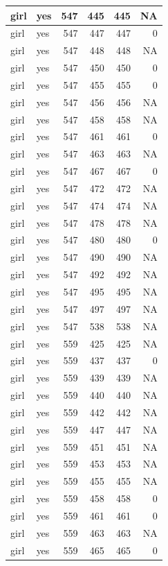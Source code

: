 \documentclass[man]{apa6}
\begin{document}
\begin{tabular}{l|l|r|r|r|r}
\hline
girl & yes & 547 & 445 & 445 & NA\\
\hline
girl & yes & 547 & 447 & 447 & 0\\
\hline
girl & yes & 547 & 448 & 448 & NA\\
\hline
girl & yes & 547 & 450 & 450 & 0\\
\hline
girl & yes & 547 & 455 & 455 & 0\\
\hline
girl & yes & 547 & 456 & 456 & NA\\
\hline
girl & yes & 547 & 458 & 458 & NA\\
\hline
girl & yes & 547 & 461 & 461 & 0\\
\hline
girl & yes & 547 & 463 & 463 & NA\\
\hline
girl & yes & 547 & 467 & 467 & 0\\
\hline
girl & yes & 547 & 472 & 472 & NA\\
\hline
girl & yes & 547 & 474 & 474 & NA\\
\hline
girl & yes & 547 & 478 & 478 & NA\\
\hline
girl & yes & 547 & 480 & 480 & 0\\
\hline
girl & yes & 547 & 490 & 490 & NA\\
\hline
girl & yes & 547 & 492 & 492 & NA\\
\hline
girl & yes & 547 & 495 & 495 & NA\\
\hline
girl & yes & 547 & 497 & 497 & NA\\
\hline
girl & yes & 547 & 538 & 538 & NA\\
\hline
girl & yes & 559 & 425 & 425 & NA\\
\hline
girl & yes & 559 & 437 & 437 & 0\\
\hline
girl & yes & 559 & 439 & 439 & NA\\
\hline
girl & yes & 559 & 440 & 440 & NA\\
\hline
girl & yes & 559 & 442 & 442 & NA\\
\hline
girl & yes & 559 & 447 & 447 & NA\\
\hline
girl & yes & 559 & 451 & 451 & NA\\
\hline
girl & yes & 559 & 453 & 453 & NA\\
\hline
girl & yes & 559 & 455 & 455 & NA\\
\hline
girl & yes & 559 & 458 & 458 & 0\\
\hline
girl & yes & 559 & 461 & 461 & 0\\
\hline
girl & yes & 559 & 463 & 463 & NA\\
\hline
girl & yes & 559 & 465 & 465 & 0\\

\end{tabular}
\end{document}
